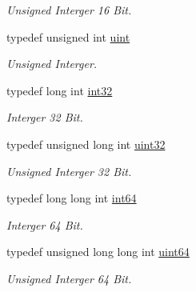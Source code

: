 \begin{DoxyCompactItemize}
\begin{DoxyCompactList}\small\item\em Unsigned Interger 16 Bit. \item\end{DoxyCompactList}\item 
\hypertarget{namespace_f2_c_a58be2bac9eb3e3c99cb41b6008bf4fae}{
typedef unsigned int \hyperlink{namespace_f2_c_a58be2bac9eb3e3c99cb41b6008bf4fae}{uint}}
\label{namespace_f2_c_a58be2bac9eb3e3c99cb41b6008bf4fae}

\begin{DoxyCompactList}\small\item\em Unsigned Interger. \item\end{DoxyCompactList}\item 
\hypertarget{namespace_f2_c_ae125264248542a3a358accdbfd2ec622}{
typedef long int \hyperlink{namespace_f2_c_ae125264248542a3a358accdbfd2ec622}{int32}}
\label{namespace_f2_c_ae125264248542a3a358accdbfd2ec622}

\begin{DoxyCompactList}\small\item\em Interger 32 Bit. \item\end{DoxyCompactList}\item 
\hypertarget{namespace_f2_c_ae9a1fcf27e85dd8fb51e9a30db5ad871}{
typedef unsigned long int \hyperlink{namespace_f2_c_ae9a1fcf27e85dd8fb51e9a30db5ad871}{uint32}}
\label{namespace_f2_c_ae9a1fcf27e85dd8fb51e9a30db5ad871}

\begin{DoxyCompactList}\small\item\em Unsigned Interger 32 Bit. \item\end{DoxyCompactList}\item 
\hypertarget{namespace_f2_c_affe55f5e807808ec6780f981396045b9}{
typedef long long int \hyperlink{namespace_f2_c_affe55f5e807808ec6780f981396045b9}{int64}}
\label{namespace_f2_c_affe55f5e807808ec6780f981396045b9}

\begin{DoxyCompactList}\small\item\em Interger 64 Bit. \item\end{DoxyCompactList}\item 
\hypertarget{namespace_f2_c_a569e63783a7f4abd693eba9bc32070e6}{
typedef unsigned long long int \hyperlink{namespace_f2_c_a569e63783a7f4abd693eba9bc32070e6}{uint64}}
\label{namespace_f2_c_a569e63783a7f4abd693eba9bc32070e6}

\begin{DoxyCompactList}\small\item\em Unsigned Interger 64 Bit. \item\end{DoxyCompactList}\end{DoxyCompactItemize}

